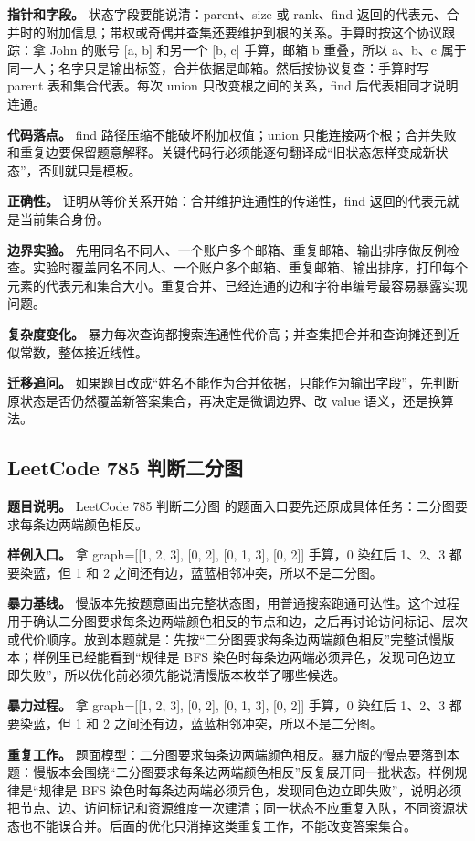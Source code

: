 \textbf{指针和字段。} 状态字段要能说清：parent、size 或 rank、find 返回的代表元、合并时的附加信息；带权或奇偶并查集还要维护到根的关系。手算时按这个协议跟踪：拿 John 的账号 [a, b] 和另一个 [b, c] 手算，邮箱 b 重叠，所以 a、b、c 属于同一人；名字只是输出标签，合并依据是邮箱。然后按协议复查：手算时写 parent 表和集合代表。每次 union 只改变根之间的关系，find 后代表相同才说明连通。

\textbf{代码落点。} find 路径压缩不能破坏附加权值；union 只能连接两个根；合并失败和重复边要保留题意解释。关键代码行必须能逐句翻译成“旧状态怎样变成新状态”，否则就只是模板。

\textbf{正确性。} 证明从等价关系开始：合并维护连通性的传递性，find 返回的代表元就是当前集合身份。

\textbf{边界实验。} 先用同名不同人、一个账户多个邮箱、重复邮箱、输出排序做反例检查。实验时覆盖同名不同人、一个账户多个邮箱、重复邮箱、输出排序，打印每个元素的代表元和集合大小。重复合并、已经连通的边和字符串编号最容易暴露实现问题。

\textbf{复杂度变化。} 暴力每次查询都搜索连通性代价高；并查集把合并和查询摊还到近似常数，整体接近线性。

\textbf{迁移追问。} 如果题目改成“姓名不能作为合并依据，只能作为输出字段”，先判断原状态是否仍然覆盖新答案集合，再决定是微调边界、改 value 语义，还是换算法。

\subsection{LeetCode 785 判断二分图}

\textbf{题目说明。} LeetCode 785 判断二分图 的题面入口要先还原成具体任务：二分图要求每条边两端颜色相反。

\textbf{样例入口。} 拿 graph=[[1, 2, 3], [0, 2], [0, 1, 3], [0, 2]] 手算，0 染红后 1、2、3 都要染蓝，但 1 和 2 之间还有边，蓝蓝相邻冲突，所以不是二分图。

\textbf{暴力基线。} 慢版本先按题意画出完整状态图，用普通搜索跑通可达性。这个过程用于确认二分图要求每条边两端颜色相反的节点和边，之后再讨论访问标记、层次或代价顺序。放到本题就是：先按“二分图要求每条边两端颜色相反”完整试慢版本；样例里已经能看到“规律是 BFS 染色时每条边两端必须异色，发现同色边立即失败”，所以优化前必须先能说清慢版本枚举了哪些候选。

\textbf{暴力过程。} 拿 graph=[[1, 2, 3], [0, 2], [0, 1, 3], [0, 2]] 手算，0 染红后 1、2、3 都要染蓝，但 1 和 2 之间还有边，蓝蓝相邻冲突，所以不是二分图。

\textbf{重复工作。} 题面模型：二分图要求每条边两端颜色相反。暴力版的慢点要落到本题：慢版本会围绕“二分图要求每条边两端颜色相反”反复展开同一批状态。样例规律是“规律是 BFS 染色时每条边两端必须异色，发现同色边立即失败”，说明必须把节点、边、访问标记和资源维度一次建清；同一状态不应重复入队，不同资源状态也不能误合并。后面的优化只消掉这类重复工作，不能改变答案集合。

